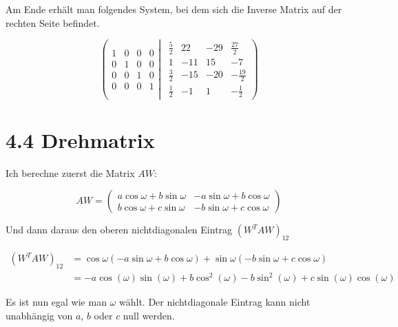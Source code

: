 \documentclass[a4paper,german,12pt,smallheadings]{scrartcl}
\begin{document}
Am Ende erhält man folgendes System, bei dem sich die Inverse Matrix auf der
rechten Seite befindet.

\begin{equation*}
\left(
 \begin{matrix}
 1 & 0 & 0 & 0 \\
 0 & 1 & 0 & 0 \\
 0 & 0 & 1 & 0 \\
 0 & 0 & 0 & 1
 \end{matrix}
 \left|
  \hspace{5pt}
  \begin{matrix}
    \frac{5}{2} & 22 & -29 & \frac{27}{2} \\
     1 & -11 & 15 & -7 \\
     \frac{3}{2} & -15 & -20 & -\frac{19}{2} \\
     \frac{1}{2} & -1 & 1 & -\frac{1}{2}
  \end{matrix}
 \right)
\right.
\end{equation*}

\section*{4.4 Drehmatrix}

Ich berechne zuerst die Matrix $AW$:

\begin{equation*}
AW =
\begin{pmatrix}
a \cos \omega + b \sin \omega & -a \sin \omega + b \cos \omega \\
b \cos \omega + c \sin \omega & -b \sin \omega + c \cos \omega
\end{pmatrix}
\end{equation*}

Und dann daraus den oberen nichtdiagonalen Eintrag $(W^TAW)_{12}$

\begin{align*}
(W^TAW)_{12} &= \cos \omega ( -a \sin \omega + b \cos \omega ) + \sin \omega (-b \sin \omega + c \cos \omega ) \\
&= -a\cos(\omega) \sin(\omega) + b \cos^2(\omega) -b \sin^2(\omega) + c\sin(\omega)\cos(\omega)
\end{align*}

Es ist nun egal wie man $\omega$ wählt. Der nichtdiagonale Eintrag kann nicht
unabhängig von $a$, $b$ oder $c$ null werden.
\end{document}
